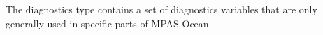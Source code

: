 The diagnostics type contains a set of diagnostics variables that are only
generally used in specific parts of MPAS-Ocean.
